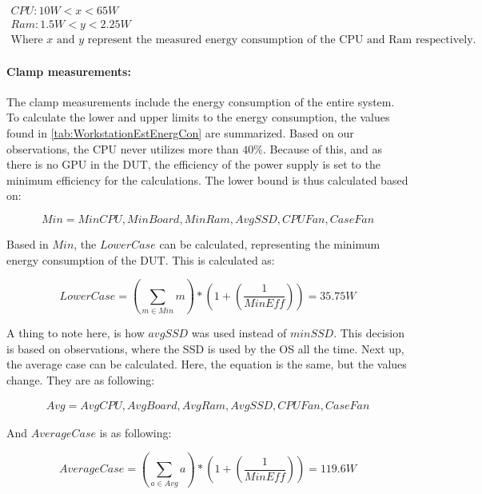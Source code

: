 \begin{gather*}
    CPU: 10W < x < 65W \\
    Ram: 1.5W < y < 2.25W \\
    \text{Where $x$ and $y$ represent the measured energy consumption of the CPU and Ram respectively.}
\end{gather*}

\paragraph{Clamp measurements:} The clamp measurements include the energy consumption of the entire system. To calculate the lower and upper limits to the energy consumption, the values found in \cref{tab:WorkstationEstEnergCon} are summarized. Based on our observations, the CPU never utilizes more than $40\%$. Because of this, and as there is no GPU in the DUT, the efficiency of the power supply is set to the minimum efficiency for the calculations. The lower bound is thus calculated based on:

\begin{equation}
    Min = {MinCPU, MinBoard, MinRam, AvgSSD, CPUFan, CaseFan}
\end{equation}

Based in $Min$, the $LowerCase$ can be calculated, representing the minimum energy consumption of the DUT. This is calculated as:

\begin{equation}
    LowerCase = \left ( \sum_{m \in Min} m \right ) * \left (1 + \left ( \frac{1}{MinEff} \right ) \right ) = 35.75W
\end{equation}

A thing to note here, is how $avgSSD$ was used instead of $minSSD$. This decision is based on observations, where the SSD is used by the OS all the time. Next up, the average case can be calculated. Here, the equation is the same, but the values change. They are as following:

\begin{eqnarray}
    Avg = {AvgCPU, AvgBoard, AvgRam, AvgSSD, CPUFan, CaseFan}
\end{eqnarray}

And $AverageCase$ is as following:

\begin{equation}
    AverageCase = \left ( \sum_{a \in Avg} a \right ) * \left (1 + \left ( \frac{1}{MinEff} \right ) \right ) = 119.6W
\end{equation}

